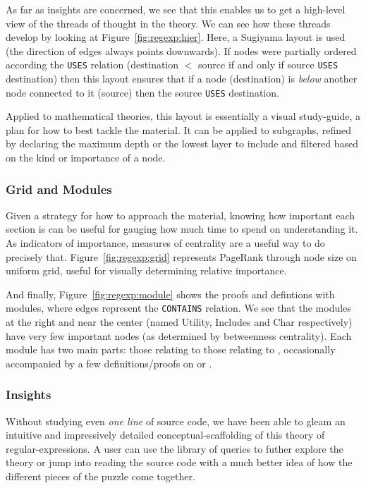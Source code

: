 As far as insights are concerned, we see that this enables us to get a
high-level view of the threads of thought in the theory. We can see how these
threads develop by looking at Figure~\ref{fig:regexp:hier}.  Here, a Sugiyama
layout is used (the direction of edges always points downwards). If nodes were
partially ordered according the \texttt{USES} relation (destination $<$ source
if and only if source \texttt{USES} destination) then this layout ensures that
if a node (destination) is \emph{below} another node connected to it (source)
then the source \texttt{USES} destination.

Applied to mathematical theories, this layout is essentially a visual
study-guide, a plan for how to best tackle the material. It can be applied to
subgraphs, refined by declaring the maximum depth or the lowest layer to include
and filtered based on the kind or importance of a node.

\subsubsection{Grid and Modules}

Given a strategy for how to approach the material, knowing how important each
section is can be useful for gauging how much time to spend on understanding it.
As indicators of importance, measures of centrality are a useful way to do
precisely that. Figure~\ref{fig:regexp:grid} represents PageRank through node
size on uniform grid, useful for visually determining relative importance.

And finally, Figure~\ref{fig:regexp:module} shows the proofs and defintions
with modules, where edges represent the \texttt{CONTAINS} relation. We see that
the modules at the right and near the center (named Utility, Includes and Char
respectively) have very few important nodes (as determined by betweenness
centrality). Each module has two main parts: those relating to
 those relating to ,
occasionally accompanied by a few definitions/proofs on 
or .

\subsubsection{Insights}

Without studying even \emph{one line} of source code, we have been able to gleam
an intuitive and impressively detailed conceptual-scaffolding of this theory of
regular-expressions. A user can use the library of queries to futher explore the
theory or jump into reading the source code with a much better idea of how
the different pieces of the puzzle come together.

